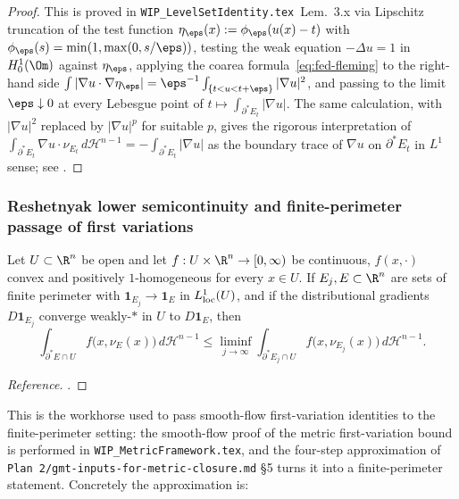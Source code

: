 \begin{proof}
This is proved in
\texttt{WIP\_LevelSetIdentity.tex}~Lem.~3.x via Lipschitz
truncation of the test function $\eta_\eps(x):=\phi_\eps(u(x)-t)$
with $\phi_\eps(s)=\min(1,\max(0,s/\eps))$, testing the weak
equation $-\Delta u=1$ in $H^1_0(\Om)$ against $\eta_\eps$, applying
the coarea formula~\eqref{eq:fed-fleming} to the right-hand side
$\int|\nabla u\cdot\nabla\eta_\eps|=\eps^{-1}\int_{\{t<u<t+\eps\}}
|\nabla u|^2$, and passing to the limit $\eps\downarrow 0$ at every
Lebesgue point of $t\mapsto\int_{\partial^*E_t}|\nabla u|$.  The same
calculation, with $|\nabla u|^2$ replaced by $|\nabla u|^p$ for
suitable $p$, gives the rigorous interpretation of
$\int_{\partial^*E_t}\nabla u\cdot\nu_{E_t}\,d\mathcal H^{n-1}
=-\int_{\partial^*E_t}|\nabla u|$ as the boundary trace of
$\nabla u$ on $\partial^*E_t$ in $L^1$ sense; see
\cite[Ch.~17]{Maggi2012}.
\end{proof}

\subsubsection{Reshetnyak lower semicontinuity and finite-perimeter
            passage of first variations}
\label{ssec:reshetnyak}

\begin{theorem}\label{thm:reshetnyak}
Let $U\subset\R^n$ be open and let
$f:U\times\R^n\to[0,\infty)$ be continuous, $f(x,\cdot)$ convex and
positively $1$-homogeneous for every $x\in U$.  If
$E_j,E\subset\R^n$ are sets of finite perimeter with
$\mathbf 1_{E_j}\to\mathbf 1_E$ in $L^1_{\rm loc}(U)$, and if the
distributional gradients $D\mathbf 1_{E_j}$ converge weakly-$*$ in
$U$ to $D\mathbf 1_E$, then
\[
   \int_{\partial^*E\cap U}f\bigl(x,\nu_E(x)\bigr)\,d\mathcal H^{n-1}
   \le\liminf_{j\to\infty}\int_{\partial^*E_j\cap U}
        f\bigl(x,\nu_{E_j}(x)\bigr)\,d\mathcal H^{n-1}.
\]
\end{theorem}

\begin{proof}[Reference]
\cite[Thm.~2.38]{AFP2000}.
\end{proof}

This is the workhorse used to pass smooth-flow first-variation
identities to the finite-perimeter setting: the smooth-flow proof of
the metric first-variation bound is performed in
\texttt{WIP\_MetricFramework.tex}, and the four-step approximation
of \texttt{Plan 2/gmt-inputs-for-metric-closure.md} \S 5 turns it
into a finite-perimeter statement.  Concretely the approximation is:

